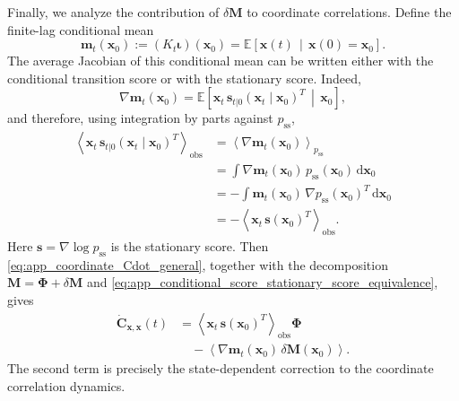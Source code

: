 \documentclass[11pt,twoside,fleqn]{article}
\renewcommand{\d}{\mathrm{d}}
\begin{document}
Finally, we analyze the contribution of $\delta\bm{M}$ to coordinate correlations. Define the finite-lag conditional mean
\begin{equation}
    \bm{m}_t(\bm{x}_0)
    :=
    (K_t\bm{\iota})(\bm{x}_0)
    =
    \mathbb{E}
    \left[
        \bm{x}(t)
        \,\middle|\,
        \bm{x}(0)=\bm{x}_0
    \right].
    \label{eq:app_conditional_mean_def}
\end{equation}
The average Jacobian of this conditional mean can be written either with the
conditional transition score or with the stationary score. Indeed,
\begin{equation}
    \nabla\bm{m}_t(\bm{x}_0)
    =
    \mathbb{E}
    \left[
        \bm{x}_t\,
        \bm{s}_{t|0}(\bm{x}_t\mid\bm{x}_0)^T
        \,\middle|\,
        \bm{x}_0
    \right],
    \label{eq:app_conditional_mean_gradient_score}
\end{equation}
and therefore, using integration by parts against \(p_{\mathrm{ss}}\),
\begin{align}
    \left\langle
        \bm{x}_t\,
        \bm{s}_{t|0}(\bm{x}_t\mid\bm{x}_0)^T
    \right\rangle_{\mathrm{obs}}
    &=
    \left\langle
        \nabla\bm{m}_t(\bm{x}_0)
    \right\rangle_{p_{\mathrm{ss}}}
    \nonumber\\
    &=
    \int
        \nabla\bm{m}_t(\bm{x}_0)\,
        p_{\mathrm{ss}}(\bm{x}_0)\,
        \d\bm{x}_0
    \nonumber\\
    &=
    -
    \int
        \bm{m}_t(\bm{x}_0)\,
        \nabla p_{\mathrm{ss}}(\bm{x}_0)^T\,
        \d\bm{x}_0
    \nonumber\\
    &=
    -
    \left\langle
        \bm{x}_t\,
        \bm{s}(\bm{x}_0)^T
    \right\rangle_{\mathrm{obs}} .
    \label{eq:app_conditional_score_stationary_score_equivalence}
\end{align}
Here \(\bm{s}=\nabla\log p_{\mathrm{ss}}\) is the stationary score.
Then \eqref{eq:app_coordinate_Cdot_general}, together with the decomposition
$\bm{M}=\bm{\Phi}+\delta\bm{M}$ and
\eqref{eq:app_conditional_score_stationary_score_equivalence}, gives
\begin{align}
    \dot{\bm{C}}_{\bm{x},\bm{x}}(t)
    &=
    \left\langle
        \bm{x}_t\,
        \bm{s}(\bm{x}_0)^T
    \right\rangle_{\mathrm{obs}}
    \bm{\Phi}
    \\
    &\quad-
    \left\langle
        \nabla\bm{m}_t(\bm{x}_0)\,
        \delta\bm{M}(\bm{x}_0)
    \right\rangle .
    \label{eq:app_coordinate_Cdot_conditional_mean}
\end{align}
The second term is precisely the state-dependent correction to the coordinate correlation dynamics.
\end{document}

